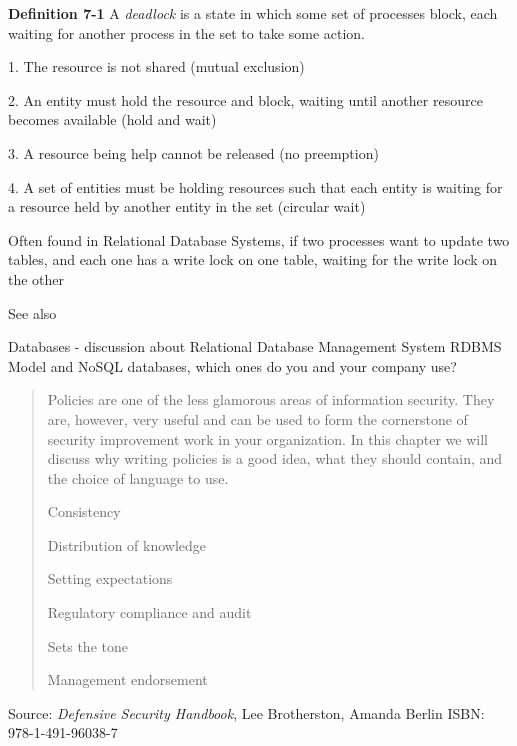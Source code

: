 \documentclass[Screen16to9,17pt]{foils}
\begin{document}
\begin{list1}
\item {\bf Definition 7-1} A \emph{deadlock} is a state in which some set of processes block, each waiting for another process in the set to take some action.
\begin{list2}
\item[1.] The resource is not shared (mutual exclusion)
\item[2.] An entity must hold the resource and block, waiting until another resource becomes available (hold and wait)
\item[3.] A resource being help cannot be released (no preemption)
\item[4.] A set of entities must be holding resources such that each entity is waiting for a resource held by another entity in the set (circular wait)
\end{list2}
\item Often found in Relational Database Systems, if two processes want to update two tables, and each one has a write lock on one table, waiting for the write lock on the other
\item See also 
\end{list1}


Databases - discussion about Relational Database Management System RDBMS Model and NoSQL databases, which ones do you and your company use?









\begin{quote}
Policies are one of the less glamorous areas of information security. They are, however, very useful and can be used to form the cornerstone of security improvement work in your organization. In this chapter we will discuss why writing policies is a good idea, what they should contain, and the choice of language to use.
\begin{list2}
\item Consistency
\item Distribution of knowledge
\item Setting expectations
\item Regulatory compliance and audit
\item Sets the tone
\item Management endorsement
\end{list2}
\end{quote}
Source: \emph{Defensive Security Handbook}, Lee Brotherston, Amanda Berlin ISBN: 978-1-491-96038-7
\end{document}
